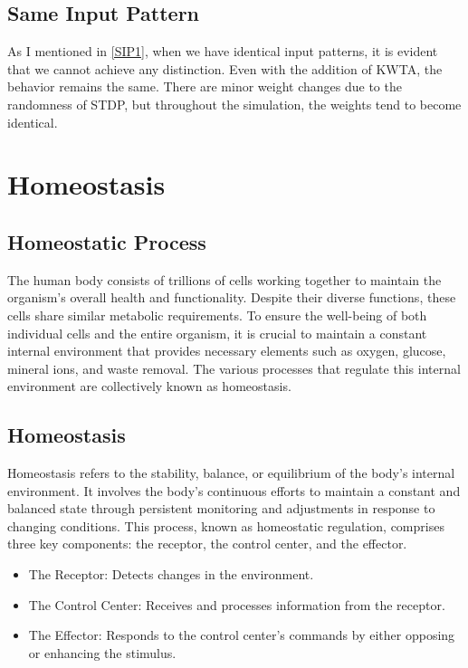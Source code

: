 \documentclass[12pt]{article}
\begin{document}
		\subsection{Same Input Pattern}
		As I mentioned in \ref{SIP1}, when we have identical input patterns, it is evident that we cannot achieve any distinction. Even with the addition of KWTA, the behavior remains the same. There are minor weight changes due to the randomness of STDP, but throughout the simulation, the weights tend to become identical.
	
	
	\section{Homeostasis}

	\subsection{Homeostatic Process}
	
The human body consists of trillions of cells working together to maintain the organism's overall health and functionality. Despite their diverse functions, these cells share similar metabolic requirements. To ensure the well-being of both individual cells and the entire organism, it is crucial to maintain a constant internal environment that provides necessary elements such as oxygen, glucose, mineral ions, and waste removal. The various processes that regulate this internal environment are collectively known as homeostasis.

\subsection{Homeostasis}
Homeostasis refers to the stability, balance, or equilibrium of the body's internal environment. It involves the body's continuous efforts to maintain a constant and balanced state through persistent monitoring and adjustments in response to changing conditions. This process, known as homeostatic regulation, comprises three key components: the receptor, the control center, and the effector.

\begin{itemize}
\item The Receptor: Detects changes in the environment.
\item The Control Center: Receives and processes information from the receptor.
\item The Effector: Responds to the control center's commands by either opposing or enhancing the stimulus.
\end{itemize}
\end{document}
